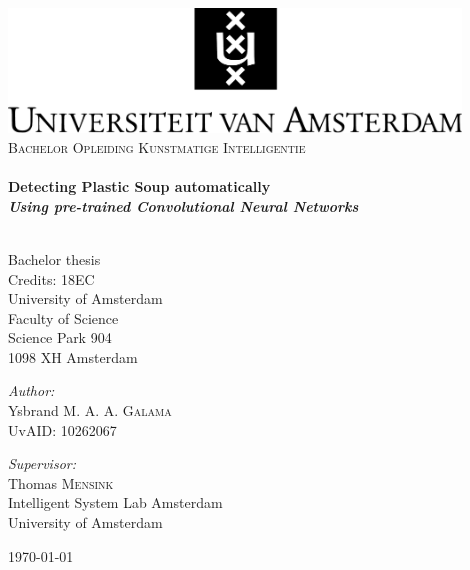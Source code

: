 \begin{titlepage}
\begin{center}
\includegraphics[width=0.9\textwidth]{images/uva-campus.pdf}\\[0.5cm]


\textsc{\large Bachelor Opleiding Kunstmatige Intelligentie}\\[1cm]

\HRule \\[0.4cm]
{\bfseries { \huge Detecting Plastic Soup automatically
} \\[0.2cm]
{\it \Large  Using pre-trained Convolutional Neural Networks}
\\[0.4cm] }

\HRule \\[1cm]

Bachelor thesis\\
Credits: 18EC\\[0.5cm]
University of Amsterdam\\
Faculty of Science\\
Science Park 904\\
1098 XH Amsterdam\\[0.5cm]

\vfill

\begin{minipage}[t]{0.4\textwidth}
\begin{flushleft}
\emph{Author:}\\
Ysbrand M. A. A. \textsc{Galama}\\
UvAID: 10262067
\end{flushleft}
\end{minipage}
\begin{minipage}[t]{0.5\textwidth}
\begin{flushright}
\emph{Supervisor:} \\
Thomas \textsc{Mensink}\\[0.4cm]
Intelligent System Lab Amsterdam\\
University of Amsterdam\\
\end{flushright}
\end{minipage}

\vfill

{\large \today}

\end{center}
\end{titlepage}